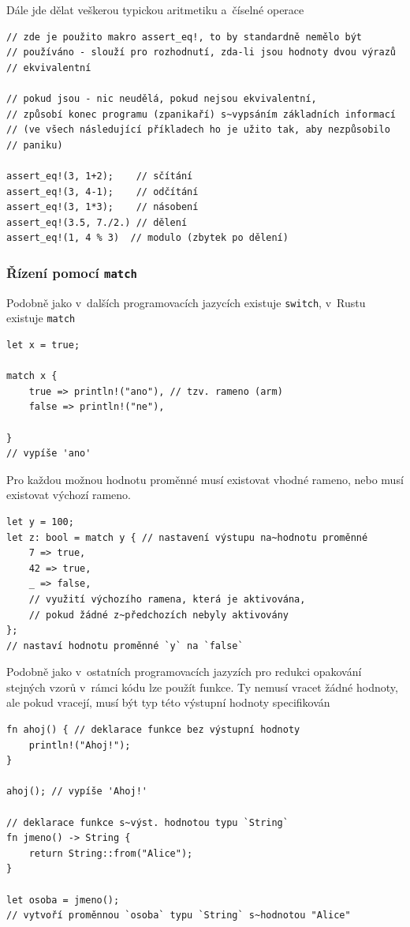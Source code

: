\documentclass[a4paper, 12pt, twoside]{article} %
\newcommand{\rust}[1]{\texttt{#1}}
\begin{document}
		Dále jde dělat veškerou typickou aritmetiku a~číselné operace
		\begin{verbatim}
// zde je použito makro assert_eq!, to by standardně nemělo být
// používáno - slouží pro rozhodnutí, zda-li jsou hodnoty dvou výrazů
// ekvivalentní

// pokud jsou - nic neudělá, pokud nejsou ekvivalentní,
// způsobí konec programu (zpanikaří) s~vypsáním základních informací
// (ve všech následující příkladech ho je užito tak, aby nezpůsobilo 
// paniku)

assert_eq!(3, 1+2);    // sčítání
assert_eq!(3, 4-1);    // odčítání
assert_eq!(3, 1*3);    // násobení
assert_eq!(3.5, 7./2.) // dělení
assert_eq!(1, 4 % 3)  // modulo (zbytek po dělení)
		\end{verbatim}

		\subsubsection*{Řízení pomocí \rust{match}}
			Podobně jako v~dalších programovacích jazycích existuje \texttt{switch}, v~Rustu existuje \rust{match}
			\begin{verbatim}
let x = true;

match x {
	true => println!("ano"), // tzv. rameno (arm)
	false => println!("ne"),
			
}
// vypíše 'ano'
			\end{verbatim}
			
			Pro každou možnou hodnotu proměnné musí existovat vhodné rameno, nebo musí existovat výchozí rameno.
			\begin{verbatim}
let y = 100;
let z: bool = match y { // nastavení výstupu na~hodnotu proměnné
	7 => true,
	42 => true,
	_ => false,
	// využití výchozího ramena, která je aktivována, 
	// pokud žádné z~předchozích nebyly aktivovány
};
// nastaví hodnotu proměnné `y` na `false`
		\end{verbatim}
		
		Podobně jako v~ostatních programovacích jazyzích pro redukci opakování stejných vzorů v~rámci kódu lze použít funkce. Ty nemusí vracet žádné hodnoty, ale pokud vracejí, musí být typ této výstupní hodnoty specifikován
		\begin{verbatim}
fn ahoj() { // deklarace funkce bez výstupní hodnoty
	println!("Ahoj!");
}

ahoj(); // vypíše 'Ahoj!'

// deklarace funkce s~výst. hodnotou typu `String`
fn jmeno() -> String {
	return String::from("Alice");
}

let osoba = jmeno();
// vytvoří proměnnou `osoba` typu `String` s~hodnotou "Alice"
		\end{verbatim}
		
\end{document}
